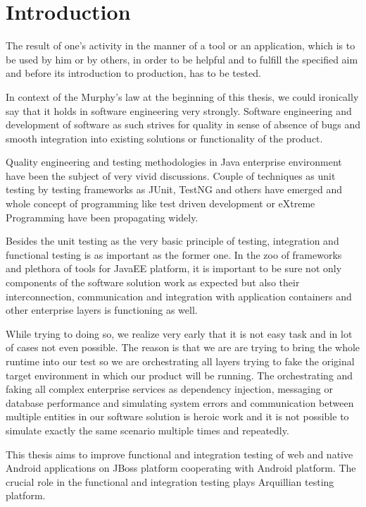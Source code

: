 \documentclass[12pt,final,oneside]{fithesis}
\begin{document}
\MainMatter
\tableofcontents

\chapter{Introduction}
The result of one's activity in the manner of a tool or an application, which is to be used by him or by others, in order to be helpful and to fulfill the specified aim and before its introduction to production, has to be tested.

In context of the Murphy's law at the beginning of this thesis, we could ironically say that it holds in software engineering very strongly. Software engineering and development of software as such strives for quality in sense of absence of bugs and smooth integration into existing solutions or functionality of the product.

Quality engineering and testing methodologies in Java enterprise environment have been the subject of very vivid discussions. Couple of techniques as unit testing by testing frameworks as JUnit, TestNG and others have emerged and whole concept of programming like test driven development or eXtreme Programming have been propagating widely. 

Besides the unit testing as the very basic principle of testing, integration and functional testing is as important as the former one. In the zoo of frameworks and plethora of tools for JavaEE platform, it is important to be sure not only components of the software solution work as expected but also their interconnection, communication and integration with application containers and other enterprise layers is functioning as well.

While trying to doing so, we realize very early that it is not easy task and in lot of cases not even possible. The reason is that we are are trying to bring the whole runtime into our test so we are orchestrating all layers trying to fake the original target environment in which our product will be running. The orchestrating and faking all complex enterprise services as dependency injection, messaging or database performance and simulating system errors and communication between multiple entities in our software solution is heroic work and it is not possible to simulate exactly the same scenario multiple times and repeatedly.

This thesis aims to improve functional and integration testing of web and native Android applications on JBoss platform cooperating with Android platform. The crucial role in the functional and integration testing plays Arquillian testing platform.
\end{document}
